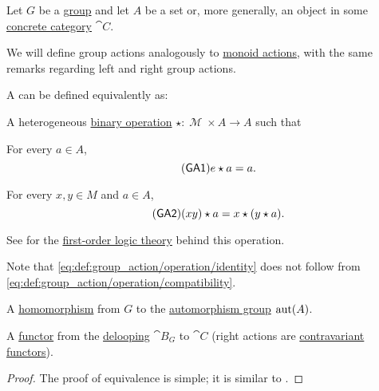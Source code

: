 \begin{definition}\label{def:group_action}
  Let \( G \) be a \hyperref[def:group]{group} and let \( A \) be a set or, more generally, an object in some \hyperref[def:concrete_category]{concrete category} \( \cat{C} \).

  We will define group actions analogously to \hyperref[def:monoid_action]{monoid actions}, with the same remarks regarding left and right group actions.

  A  can be defined equivalently as:
  \begin{thmenum}
     A heterogeneous \hyperref[def:magma]{binary operation} \( \star: \mscrM \times A \to A \) such that
    \begin{thmenum}
       For every \( a \in A \),
      \begin{equation}\label{eq:def:group_action/operation/identity}\tag{\logic{GA1}}
        e \star a = a.
      \end{equation}

       For every \( x, y \in M \) and \( a \in A \),
      \begin{equation}\label{eq:def:group_action/operation/compatibility}\tag{\logic{GA2}}
        (xy) \star a = x \star (y \star a).
      \end{equation}
    \end{thmenum}

    See  for the \hyperref[def:first_order_theory]{first-order logic theory} behind this operation.

    Note that \eqref{eq:def:group_action/operation/identity} does not follow from \eqref{eq:def:group_action/operation/compatibility}.

     A \hyperref[def:group/homomorphism]{homomorphism} from \( G \) to the \hyperref[def:automorphism_group]{automorphism group} \( \operatorname{aut}(A) \).

     A \hyperref[def:functor]{functor} from the \hyperref[def:monoid_delooping]{delooping} \( \cat{B}_G \) to \( \cat{C} \) (right actions are \hyperref[rem:contravariant_functor]{contravariant functors}).
  \end{thmenum}
\end{definition}
\begin{proof}
  The proof of equivalence is simple; it is similar to .
\end{proof}

